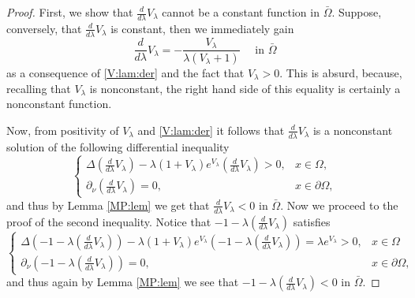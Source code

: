 \documentclass[10pt,a4paper]{amsart}
\begin{document}
\begin{proof}  First, we show that $\frac{d}{d\lambda}V_{\lambda}$ cannot be a constant function in $\bar{\Omega}.$ Suppose, conversely, that $\frac{d}{d\lambda}V_{\lambda}$ is constant, then we immediately gain 
$$
\frac{d}{d\lambda}V_{\lambda} = -\frac{V_\lambda}{\lambda(V_\lambda + 1)}  \quad \text{ in } \bar{\Omega}
$$ 
as a consequence of \eqref{V:lam:der} and the fact that $V_\lambda > 0$. This is absurd, because, recalling that $V_\lambda$ is nonconstant, the right hand side of this equality is certainly a nonconstant function. 

 Now, from positivity of $V_\lambda$ and \eqref{V:lam:der} it follows that $\frac{d}{d\lambda}V_{\lambda}$ is a  nonconstant solution of the following differential inequality
$$
\left\{\begin{array}{lr}
\Delta \left(\frac{d}{d\lambda}V_{\lambda}\right)-\lambda(1+V_\lambda)e^{V_\lambda}\left(\frac{d}{d\lambda}V_{\lambda}\right)>0,& x\in\Omega,\\
\partial_\nu \left(\frac{d}{d\lambda}V_{\lambda}\right)=0,& x\in\partial\Omega, 
\end{array}\right.
$$
and thus by Lemma \ref{MP:lem} we get that $\frac{d}{d\lambda}V_{\lambda}<0$ in $\bar{\Omega}.$ Now we proceed to the proof of the second inequality. Notice that $-1-\lambda \left(\frac{d}{d\lambda}V_{\lambda}\right)$ satisfies 
$$
\left\{\begin{array}{lr}
\Delta\left(-1-\lambda \left(\frac{d}{d\lambda}V_{\lambda}\right)\right)-\lambda(1+V_\lambda)e^{V_\lambda}\left(-1-\lambda \left(\frac{d}{d\lambda}V_{\lambda}\right)\right)=\lambda e^{V_\lambda}>0,&x\in\Omega\\
\partial_\nu \left(-1-\lambda \left(\frac{d}{d\lambda}V_{\lambda}\right)\right)=0,& x\in\partial\Omega,
\end{array}\right.
$$
and thus again by Lemma \ref{MP:lem} we see that $-1-\lambda \left(\frac{d}{d\lambda}V_{\lambda}\right)<0$ in $\bar{\Omega}.$


\end{proof}
\end{document}
